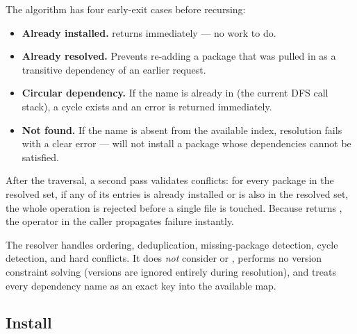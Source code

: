 The algorithm has four early-exit cases before recursing:

\begin{itemize}
  \item \textbf{Already installed.}  returns immediately --- no work to do.
  \item \textbf{Already resolved.} Prevents re-adding a package that was pulled in as a transitive dependency of an earlier request.
  \item \textbf{Circular dependency.} If the name is already in  (the current DFS call stack), a cycle exists and an error is returned immediately.
  \item \textbf{Not found.} If the name is absent from the available index, resolution fails with a clear error ---  will not install a package whose dependencies cannot be satisfied.
\end{itemize}

After the traversal, a second pass validates conflicts: for every package in the resolved set, if any of its  entries is already installed or is also in the resolved set, the whole operation is rejected before a single file is touched. Because  returns , the  operator in the caller propagates failure instantly.

\begin{notebox}
The resolver handles ordering, deduplication, missing-package detection, cycle detection, and hard conflicts. It does \emph{not} consider  or , performs no version constraint solving (versions are ignored entirely during resolution), and treats every dependency name as an exact key into the available map.
\end{notebox}

\subsection{Install}

